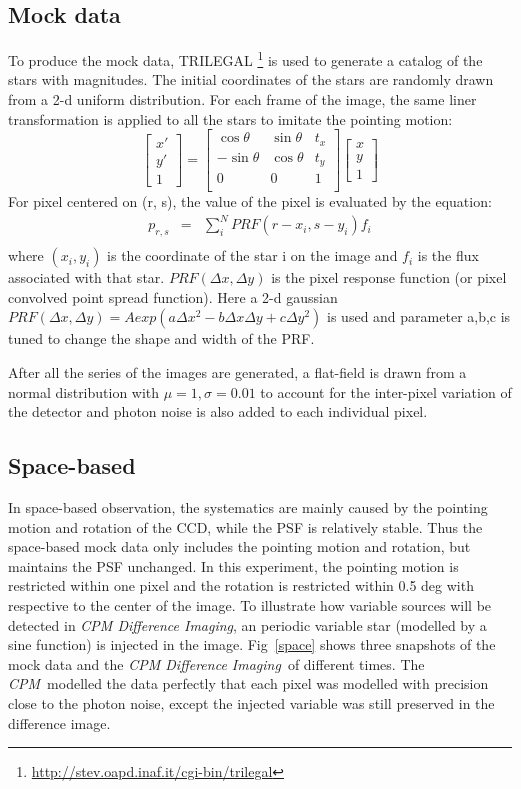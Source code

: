 \documentclass[12pt, preprint]{aastex}
\newcommand{\project}[1]{\textsl{#1}}
\newcommand{\cpm}{\project{CPM}}
\newcommand{\cpmdiff}{\project{CPM Difference Imaging}}
\begin{document}
\subsection{Mock data}
To produce the mock data, TRILEGAL \footnote{\url{http://stev.oapd.inaf.it/cgi-bin/trilegal}} is used to generate a catalog of the stars with magnitudes. 
The initial coordinates of the stars are randomly drawn from a 2-d uniform distribution. 
For each frame of the image, the same liner transformation is applied  to all the stars to imitate the pointing motion:
\[
\begin{bmatrix}
    x' \\
    y' \\
    1
\end{bmatrix}
=
\begin{bmatrix}
    \cos \theta & \sin \theta & t_x \\
    -\sin \theta & \cos \theta & t_y \\
    0 & 0 & 1 \\
\end{bmatrix}
\begin{bmatrix}
    x \\
    y \\
    1
\end{bmatrix}
\] 
For pixel centered on (r, s), the value of the pixel is evaluated by the equation:
\begin{eqnarray}
p_{r,s} &=& \sum_{i}^{N} PRF(r-x_i, s-y_i) f_i\\
\end{eqnarray}
where $(x_i,y_i)$ is the coordinate of the star i on the image and $f_i$ is the flux associated with that star. 
$PRF(\Delta x, \Delta y)$ is the pixel response function (or pixel convolved point spread function). 
Here a 2-d gaussian $PRF(\Delta x, \Delta y) = A exp(a\Delta x^2-b\Delta x \Delta y+c\Delta y^2)$ is used and parameter a,b,c is tuned to change the shape and width of the PRF.

After all the series of the images are generated, a flat-field is drawn from a normal distribution with $\mu=1, \sigma=0.01$ to account for the inter-pixel variation of the detector and photon noise is also added to each individual pixel.

\subsection{Space-based}
In space-based observation, the systematics are mainly caused by the pointing motion and rotation of the CCD, while the PSF is relatively stable. 
Thus the space-based mock data only includes the pointing motion and rotation, but maintains the PSF unchanged.
In this experiment, the pointing motion is restricted within one pixel and the rotation is restricted within 0.5 deg with respective to the center of the image.  
To illustrate how variable sources will be detected in \cpmdiff, an periodic variable star (modelled by a sine function) is injected in the image.
Fig~\ref{space} shows three snapshots of the mock data and the \cpmdiff\ of different times. 
The \cpm\ modelled the data perfectly that each pixel was modelled with precision close to the photon noise, except  the injected variable was still preserved in the difference image.
\end{document}
